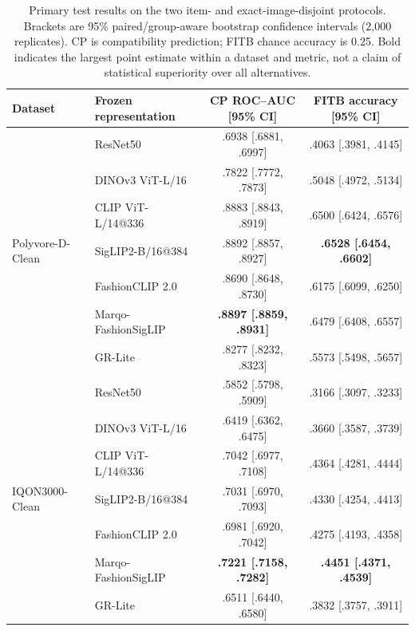\begin{table}[htbp]
\caption{Primary test results on the two item- and exact-image-disjoint protocols. Brackets are 95\% paired/group-aware bootstrap confidence intervals (2,000 replicates). CP is compatibility prediction; FITB chance accuracy is 0.25. Bold indicates the largest point estimate within a dataset and metric, not a claim of statistical superiority over all alternatives.}
\label{tab:main}
\centering
\small
\setlength{\tabcolsep}{5pt}
\begin{tabular}{llcc}
\toprule
Dataset & Frozen representation & CP ROC--AUC [95\% CI] & FITB accuracy [95\% CI] \\
\midrule
\multirow{7}{*}{Polyvore-D-Clean}
 & ResNet50 & .6938 [.6881, .6997] & .4063 [.3981, .4145] \\
 & DINOv3 ViT-L/16 & .7822 [.7772, .7873] & .5048 [.4972, .5134] \\
 & CLIP ViT-L/14@336 & .8883 [.8843, .8919] & .6500 [.6424, .6576] \\
 & SigLIP2-B/16@384 & .8892 [.8857, .8927] & \textbf{.6528 [.6454, .6602]} \\
 & FashionCLIP 2.0 & .8690 [.8648, .8730] & .6175 [.6099, .6250] \\
 & Marqo-FashionSigLIP & \textbf{.8897 [.8859, .8931]} & .6479 [.6408, .6557] \\
 & GR-Lite & .8277 [.8232, .8323] & .5573 [.5498, .5657] \\
\midrule
\multirow{7}{*}{IQON3000-Clean}
 & ResNet50 & .5852 [.5798, .5909] & .3166 [.3097, .3233] \\
 & DINOv3 ViT-L/16 & .6419 [.6362, .6475] & .3660 [.3587, .3739] \\
 & CLIP ViT-L/14@336 & .7042 [.6977, .7108] & .4364 [.4281, .4444] \\
 & SigLIP2-B/16@384 & .7031 [.6970, .7093] & .4330 [.4254, .4413] \\
 & FashionCLIP 2.0 & .6981 [.6920, .7042] & .4275 [.4193, .4358] \\
 & Marqo-FashionSigLIP & \textbf{.7221 [.7158, .7282]} & \textbf{.4451 [.4371, .4539]} \\
 & GR-Lite & .6511 [.6440, .6580] & .3832 [.3757, .3911] \\
\bottomrule
\end{tabular}
\end{table}
